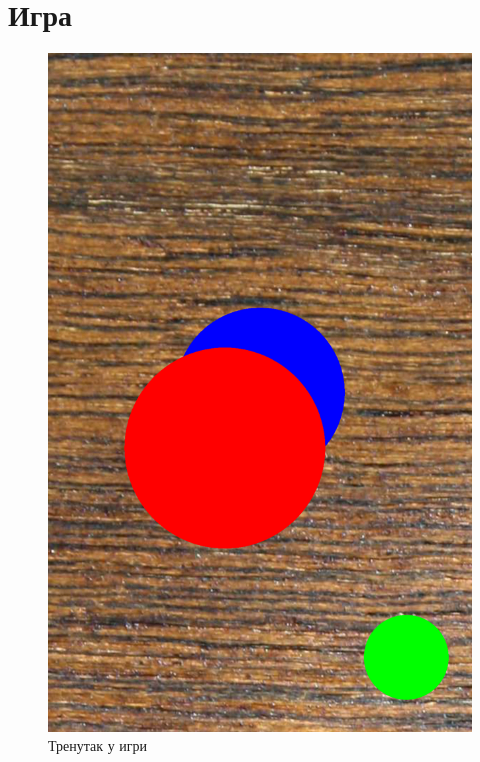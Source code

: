 \section{Игра}\label{game}
\begin{figure}[htb!]
\begin{center}
\includegraphics[scale=.1]{pictures/game/game}
\caption{Тренутак у игри}\label{fig:gameGame}
\end{center}
\end{figure}


